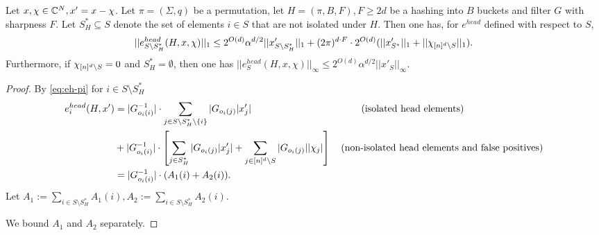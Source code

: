 \begin{lemma}\label{lm:l1b-single-pi}
Let $x, \chi\in \mathbb{C}^N, x'=x-\chi$. 
Let $\pi=(\Sigma, q)$ be a permutation, let $H=(\pi, B, F), F\geq 2d$ be a hashing into $B$ buckets and filter $G$ with sharpness $F$. Let $S^*_H\subseteq S$ denote the set of elements $i\in S$ that are not isolated under $H$. Then one has, for $e^{head}$ defined with respect to $S$, 
$$
||e^{head}_{S\setminus S^*_H}(H, x, \chi)||_1\leq 2^{O(d)} \alpha^{d/2} ||x'_{S\setminus S^*_H}||_1+(2\pi)^{d\cdot F} \cdot 2^{O(d)} (||x'_{S^*}||_1+||\chi_{{[n]^d}\setminus S}||_1).
$$
Furthermore, if $\chi_{{[n]^d}\setminus S}=0$ and $S^*_H=\emptyset$, then one has $||e^{head}_{S}(H, x, \chi)||_\infty\leq 2^{O(d)}\alpha^{d/2} ||x'_S||_\infty$.
\end{lemma}
\begin{proof}
By \eqref{eq:eh-pi} for $i\in S\setminus S^*_H$
\begin{equation}\label{eq:asdf}
\begin{split}
e^{head}_{i}(H, x')&= |G_{o_i(i)}^{-1}|\cdot \sum_{j\in S\setminus S^*_H \setminus  \{i\}} |G_{o_i(j)}|x'_j|\text{~~~~~~~~~~~~~~~~~~~~~~~~~~~~~~~~~~(isolated head elements)}\\
&+|G_{o_i(i)}^{-1}|\cdot \left[\sum_{j\in S^*_H} |G_{o_i(j)}|x'_j|+\sum_{j\in {[n]^d}\setminus S} |G_{o_i(j)}||\chi_j|\right]\text{~~~(non-isolated head elements and false positives)}\\
&=|G_{o_i(i)}^{-1}|\cdot (A_1(i)+A_2(i)).
\end{split}
\end{equation}
Let $A_1:=\sum_{i\in S\setminus S^*_H} A_1(i), A_2:=\sum_{i\in S\setminus S^*_H} A_2(i)$.

We bound $A_1$ and $A_2$ separately. 


\end{proof}
